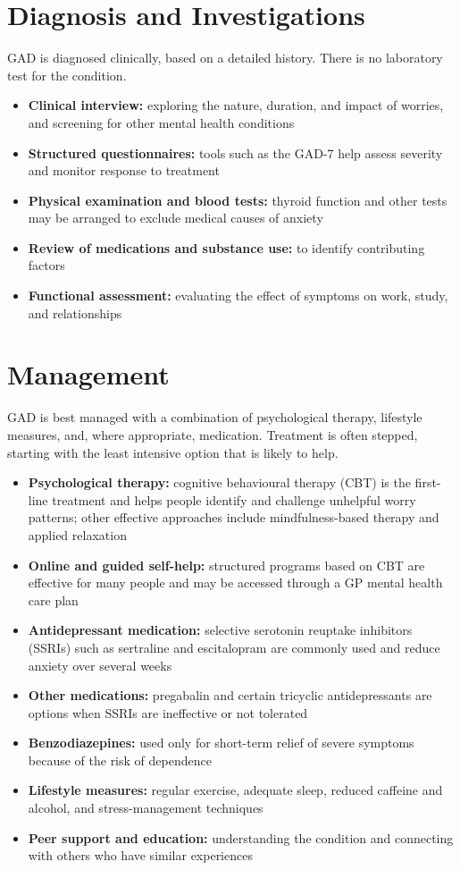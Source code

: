 \section*{Diagnosis and Investigations}
GAD is diagnosed clinically, based on a detailed history. There is no laboratory test for the condition.

\begin{itemize}
    \item \textbf{Clinical interview:} exploring the nature, duration, and impact of worries, and screening for other mental health conditions
    \item \textbf{Structured questionnaires:} tools such as the GAD-7 help assess severity and monitor response to treatment
    \item \textbf{Physical examination and blood tests:} thyroid function and other tests may be arranged to exclude medical causes of anxiety
    \item \textbf{Review of medications and substance use:} to identify contributing factors
    \item \textbf{Functional assessment:} evaluating the effect of symptoms on work, study, and relationships
\end{itemize}

\section*{Management}
GAD is best managed with a combination of psychological therapy, lifestyle measures, and, where appropriate, medication. Treatment is often stepped, starting with the least intensive option that is likely to help.

\begin{itemize}
    \item \textbf{Psychological therapy:} cognitive behavioural therapy (CBT) is the first-line treatment and helps people identify and challenge unhelpful worry patterns; other effective approaches include mindfulness-based therapy and applied relaxation
    \item \textbf{Online and guided self-help:} structured programs based on CBT are effective for many people and may be accessed through a GP mental health care plan
    \item \textbf{Antidepressant medication:} selective serotonin reuptake inhibitors (SSRIs) such as sertraline and escitalopram are commonly used and reduce anxiety over several weeks
    \item \textbf{Other medications:} pregabalin and certain tricyclic antidepressants are options when SSRIs are ineffective or not tolerated
    \item \textbf{Benzodiazepines:} used only for short-term relief of severe symptoms because of the risk of dependence
    \item \textbf{Lifestyle measures:} regular exercise, adequate sleep, reduced caffeine and alcohol, and stress-management techniques
    \item \textbf{Peer support and education:} understanding the condition and connecting with others who have similar experiences
\end{itemize}

